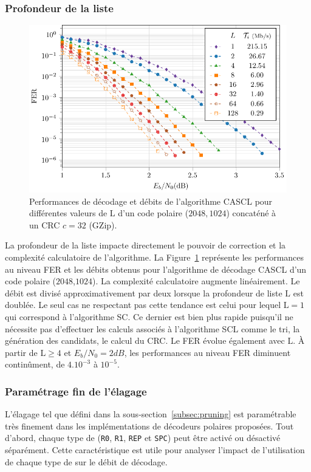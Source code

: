 \subsubsection{Profondeur de la liste}
\begin{figure}[t]
\includegraphics[width=\textwidth]{main/ch2_fig/curves/L/tikz/L}
\caption{Performances de décodage et débits de l'algorithme CASCL pour différentes valeurs de $\mathrm{L}$ d'un code polaire ($2048,1024$) concaténé à un CRC $c=32$ (GZip).}
\label{fig:scl_l_thr}
\end{figure}
La profondeur de la liste impacte directement le pouvoir de correction et la complexité calculatoire de l'algorithme. La Figure~\ref{fig:scl_l_thr} représente les performances au niveau FER et les débits obtenus pour l'algorithme de décodage CASCL d'un code polaire ($2048$,$1024$). La complexité calculatoire augmente linéairement. Le débit est divisé approximativement par deux lorsque la profondeur de liste $\mathrm{L}$ est doublée. Le seul cas ne respectant pas cette tendance est celui pour lequel $\mathrm{L}=1$ qui correspond à l'algorithme SC. Ce dernier est bien plus rapide puisqu'il ne nécessite pas d'effectuer les calculs associés à l'algorithme SCL comme le tri, la génération des candidats, le calcul du CRC. Le FER évolue également avec $\mathrm{L}$. \`A partir de $\mathrm{L}\geq4$ et $E_b/N_0=2dB$, les performances au niveau FER diminuent continûment, de $4.10^{-3}$ à $10^{-5}$.

\subsubsection{Paramétrage fin de l'élagage}
L'élagage tel que défini dans la sous-section~\ref{subsec:pruning} est paramétrable très finement dans les implémentations de décodeurs polaires proposées. Tout d'abord, chaque type de \noeud (\texttt{R0}, \texttt{R1}, \texttt{REP} et \texttt{SPC}) peut être activé ou désactivé séparément. Cette caractéristique est utile pour analyser l'impact de l'utilisation de chaque type de \noeud sur le débit de décodage.

